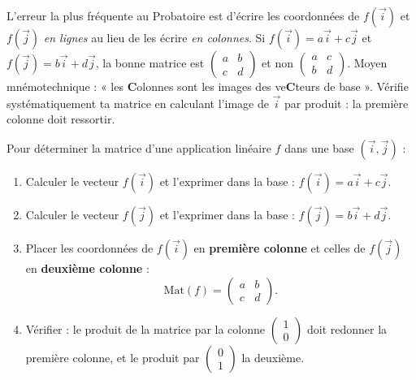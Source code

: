 \documentclass[11pt]{article}
\begin{document}
\begin{attention}
L'erreur la plus fréquente au Probatoire est d'écrire les coordonnées de $f(\vec{i})$ et $f(\vec{j})$ \emph{en lignes} au lieu de les écrire \emph{en colonnes}. Si $f(\vec{i}) = a\vec{i} + c\vec{j}$ et $f(\vec{j}) = b\vec{i} + d\vec{j}$, la bonne matrice est $\begin{pmatrix} a & b \\ c & d \end{pmatrix}$ et non $\begin{pmatrix} a & c \\ b & d \end{pmatrix}$. Moyen mnémotechnique : « les \textbf{C}olonnes sont les images des ve\textbf{C}teurs de base ». Vérifie systématiquement ta matrice en calculant l'image de $\vec{i}$ par produit : la première colonne doit ressortir.
\end{attention}

\begin{methode}
Pour déterminer la matrice d'une application linéaire $f$ dans une base $(\vec{i}, \vec{j})$ :
\begin{enumerate}
\item Calculer le vecteur $f(\vec{i})$ et l'exprimer dans la base : $f(\vec{i}) = a\vec{i} + c\vec{j}$.
\item Calculer le vecteur $f(\vec{j})$ et l'exprimer dans la base : $f(\vec{j}) = b\vec{i} + d\vec{j}$.
\item Placer les coordonnées de $f(\vec{i})$ en \textbf{première colonne} et celles de $f(\vec{j})$ en \textbf{deuxième colonne} :
\[ \mathrm{Mat}(f) = \begin{pmatrix} a & b \\ c & d \end{pmatrix}. \]
\item Vérifier : le produit de la matrice par la colonne $\begin{pmatrix} 1 \\ 0 \end{pmatrix}$ doit redonner la première colonne, et le produit par $\begin{pmatrix} 0 \\ 1 \end{pmatrix}$ la deuxième.
\end{enumerate}
\end{methode}
\end{document}
